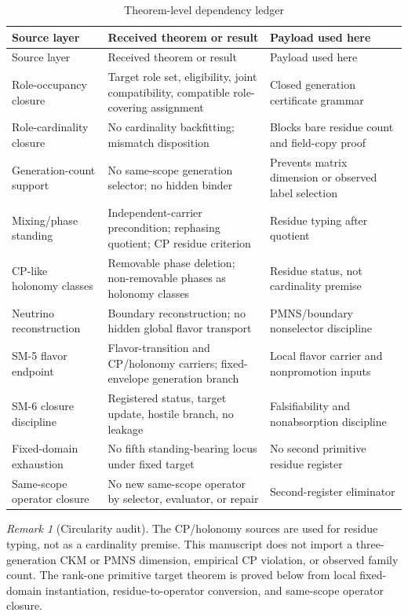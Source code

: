 \documentclass[11pt]{article}
\theoremstyle{definition}
\theoremstyle{plain}
\theoremstyle{remark}
\newtheorem{remark}{Remark}[section]
\begin{document}
\begin{longtable}{L{0.28\textwidth}L{0.36\textwidth}L{0.26\textwidth}}
\caption{Theorem-level dependency ledger}\label{tab:dep}\\
\toprule
Source layer & Received theorem or result & Payload used here\\
\midrule
\endfirsthead
\toprule
Source layer & Received theorem or result & Payload used here\\
\midrule
\endhead
Role-occupancy closure & Target role set, eligibility, joint compatibility, compatible role-covering assignment & Closed generation certificate grammar\\
Role-cardinality closure & No cardinality backfitting; mismatch disposition & Blocks bare residue count and field-copy proof\\
Generation-count support & No same-scope generation selector; no hidden binder & Prevents matrix dimension or observed label selection\\
Mixing/phase standing & Independent-carrier precondition; rephasing quotient; CP residue criterion & Residue typing after quotient\\
CP-like holonomy classes & Removable phase deletion; non-removable phases as holonomy classes & Residue status, not cardinality premise\\
Neutrino reconstruction & Boundary reconstruction; no hidden global flavor transport & PMNS/boundary nonselector discipline\\
SM-5 flavor endpoint & Flavor-transition and CP/holonomy carriers; fixed-envelope generation branch & Local flavor carrier and nonpromotion inputs\\
SM-6 closure discipline & Registered status, target update, hostile branch, no leakage & Falsifiability and nonabsorption discipline\\
Fixed-domain exhaustion & No fifth standing-bearing locus under fixed target & No second primitive residue register\\
Same-scope operator closure & No new same-scope operator by selector, evaluator, or repair & Second-register eliminator\\
\bottomrule
\end{longtable}

\begin{remark}[Circularity audit]
The CP/holonomy sources are used for residue typing, not as a cardinality premise. This manuscript does not import a three-generation CKM or PMNS dimension, empirical CP violation, or observed family count. The rank-one primitive target theorem is proved below from local fixed-domain instantiation, residue-to-operator conversion, and same-scope operator closure.
\end{remark}
\end{document}
